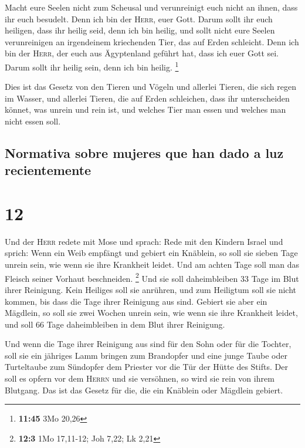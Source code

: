  Macht eure Seelen nicht zum Scheusal und verunreinigt
euch nicht an ihnen, dass ihr euch besudelt.  Denn ich
bin der \textsc{Herr}, euer Gott. Darum sollt ihr euch heiligen, dass
ihr heilig seid, denn ich bin heilig, und sollt nicht eure Seelen
verunreinigen an irgendeinem kriechenden Tier, das auf Erden schleicht.
 Denn ich bin der \textsc{Herr}, der euch aus Ägyptenland
geführt hat, dass ich euer Gott sei. Darum sollt ihr heilig sein, denn
ich bin heilig. \footnote{\textbf{11:45} 3Mo 20,26}

 Dies ist das Gesetz von den Tieren und Vögeln und
allerlei Tieren, die sich regen im Wasser, und allerlei Tieren, die auf
Erden schleichen,  dass ihr unterscheiden könnet, was
unrein und rein ist, und welches Tier man essen und welches man nicht
essen soll.

\hypertarget{normativa-sobre-mujeres-que-han-dado-a-luz-recientemente}{%
\subsection{Normativa sobre mujeres que han dado a luz
recientemente}\label{normativa-sobre-mujeres-que-han-dado-a-luz-recientemente}}

\hypertarget{section-11}{%
\section{12}\label{section-11}}

 Und der \textsc{Herr} redete mit Mose und sprach:
 Rede mit den Kindern Israel und sprich: Wenn ein Weib
empfängt und gebiert ein Knäblein, so soll sie sieben Tage unrein sein,
wie wenn sie ihre Krankheit leidet.  Und am achten Tage
soll man das Fleisch seiner Vorhaut beschneiden. \footnote{\textbf{12:3}
  1Mo 17,11-12; Joh 7,22; Lk 2,21}  Und sie soll
daheimbleiben 33 Tage im Blut ihrer Reinigung. Kein Heiliges soll sie
anrühren, und zum Heiligtum soll sie nicht kommen, bis dass die Tage
ihrer Reinigung aus sind.  Gebiert sie aber ein Mägdlein,
so soll sie zwei Wochen unrein sein, wie wenn sie ihre Krankheit leidet,
und soll 66 Tage daheimbleiben in dem Blut ihrer Reinigung.

 Und wenn die Tage ihrer Reinigung aus sind für den Sohn
oder für die Tochter, soll sie ein jähriges Lamm bringen zum Brandopfer
und eine junge Taube oder Turteltaube zum Sündopfer dem Priester vor die
Tür der Hütte des Stifts.  Der soll es opfern vor dem
\textsc{Herrn} und sie versöhnen, so wird sie rein von ihrem Blutgang.
Das ist das Gesetz für die, die ein Knäblein oder Mägdlein gebiert.

